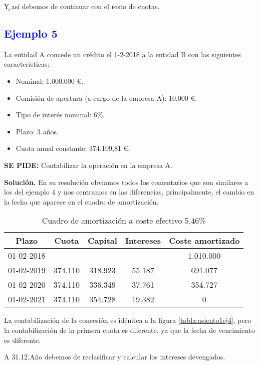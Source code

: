 \c{Y así debemos de continuar con el resto de cuotas.}

\subsection*{\textcolor{blue}{Ejemplo 5}}

La entidad A concede un crédito el 1-2-2018 a la entidad B con las siguientes características:
\begin{itemize}
    \item Nominal: 1.000.000 €.
    \item Comisión de apertura (a cargo de la empresa A): 10.000 €.
    \item Tipo de interés nominal: 6\%.
    \item Plazo: 3 años.
    \item Cuota anual constante: 374.109,81 €.
\end{itemize}

\textbf{SE PIDE:} Contabilizar la operación en la empresa A.

\textbf{Solución.} En su resolución obviamos todos los comentarios que son similares a los del ejemplo 4 y nos centramos en las diferencias, principalmente, el cambio en la fecha que aparece en el cuadro de amortización.

\begin{table}[h!]
\centering
\begin{tabular}{|c|c|c|c|c|}
\hline
\textbf{Plazo} & \textbf{Cuota} & \textbf{Capital} & \textbf{Intereses} & \textbf{Coste amortizado} \\ \hline
01-02-2018 &  &  &  & 1.010.000 \\ \hline
01-02-2019 & 374.110 & 318.923 & 55.187 & 691.077 \\ \hline
01-02-2020 & 374.110 & 336.349 & 37.761 & 354.727 \\ \hline
01-02-2021 & 374.110 & 354.728 & 19.382 & 0 \\ \hline
\end{tabular}
\caption{Cuadro de amortización a coste efectivo 5,46\%}
\label{tabla:amortizacion2}
\end{table}

La contabilización de la concesión es idéntica a la figura \ref{tabla:asiento1ej4}, pero la contabilización de la primera cuota es diferente, ya que la fecha de vencimiento es diferente.

A 31.12.Año debemos de reclasificar y calcular los intereses devengados.

